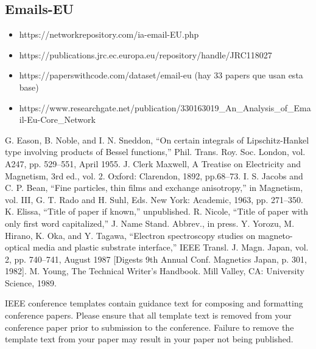 \documentclass[conference]{IEEEtran}
\begin{document}
\subsection{Emails-EU}
\begin{itemize}
    \item https://networkrepository.com/ia-email-EU.php
    \item https://publications.jrc.ec.europa.eu/repository/handle/JRC118027
    \item https://paperswithcode.com/dataset/email-eu (hay 33 papers que usan esta base)
    \item https://www.researchgate.net/publication/330163019_An_Analysis_of_Email-Eu-Core_Network

\end{itemize}




\begin{thebibliography}{00}
 G. Eason, B. Noble, and I. N. Sneddon, ``On certain integrals of Lipschitz-Hankel type involving products of Bessel functions,'' Phil. Trans. Roy. Soc. London, vol. A247, pp. 529--551, April 1955.
 J. Clerk Maxwell, A Treatise on Electricity and Magnetism, 3rd ed., vol. 2. Oxford: Clarendon, 1892, pp.68--73.
 I. S. Jacobs and C. P. Bean, ``Fine particles, thin films and exchange anisotropy,'' in Magnetism, vol. III, G. T. Rado and H. Suhl, Eds. New York: Academic, 1963, pp. 271--350.
 K. Elissa, ``Title of paper if known,'' unpublished.
 R. Nicole, ``Title of paper with only first word capitalized,'' J. Name Stand. Abbrev., in press.
 Y. Yorozu, M. Hirano, K. Oka, and Y. Tagawa, ``Electron spectroscopy studies on magneto-optical media and plastic substrate interface,'' IEEE Transl. J. Magn. Japan, vol. 2, pp. 740--741, August 1987 [Digests 9th Annual Conf. Magnetics Japan, p. 301, 1982].
 M. Young, The Technical Writer's Handbook. Mill Valley, CA: University Science, 1989.
\end{thebibliography}
\vspace{12pt}
\color{red}
IEEE conference templates contain guidance text for composing and formatting conference papers. Please ensure that all template text is removed from your conference paper prior to submission to the conference. Failure to remove the template text from your paper may result in your paper not being published.
\end{document}
